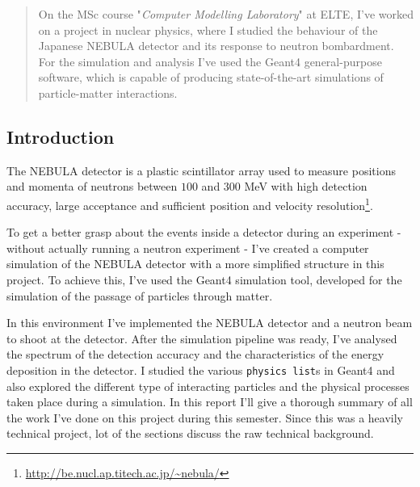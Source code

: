 \begin{abstract}
	On the MSc course "\textit{Computer Modelling Laboratory}" at ELTE, I've worked on a project in nuclear physics, where I studied the behaviour of the Japanese NEBULA detector and its response to neutron bombardment. For the simulation and analysis I've used the Geant4 general-purpose software, which is capable of producing state-of-the-art simulations of particle-matter interactions.
\end{abstract}

\begin{multicols}{2}
\section{Introduction} \label{sec:1}
The NEBULA detector is a plastic scintillator array used to measure positions and momenta of neutrons between $100$ and $300$ MeV with high detection accuracy, large acceptance and sufficient position and velocity resolution\footnote{\url{http://be.nucl.ap.titech.ac.jp/~nebula/}}.

To get a better grasp about the events inside a detector during an experiment - without actually running a neutron experiment - I've created a computer simulation of the NEBULA detector with a more simplified structure in this project. To achieve this, I've used the Geant4 simulation tool, developed for the simulation of the passage of particles through matter.

In this environment I've implemented the NEBULA detector and a neutron beam to shoot at the detector. After the simulation pipeline was ready, I've analysed the spectrum of the detection accuracy and the characteristics of the energy deposition in the detector. I studied the various \texttt{physics list}s in Geant4 and also explored the different type of interacting particles and the physical processes taken place during a simulation. In this report I'll give a thorough summary of all the work I've done on this project during this semester. Since this was a heavily technical project, lot of the sections discuss the raw technical background.


\end{multicols}
